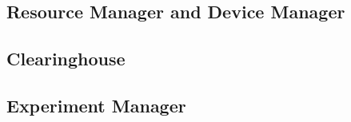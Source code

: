 \begin{comment}
The contract on line 11 - 17 defines that the target
for \path{get_location()} is \path{restricted_get_location()}. If 
\path{restrict_location} is the first descendant of the sandbox kernel, then
\path{restricted_get_location()} will replace the \path{get_location()}
in the sandbox virtual namespace. If there is a preceding blurring layer 
before \path{restrict_location} that already updated its 
function mapping for \path{get_location()} (like \path{blur_to_city}  
in Section~\ref{sec-precision-example}), then
\path{restricted_get_location()} will replace the \path{get_location()} call
with the policy implemented in this preceding blurring layer. In this case, 
the experiment code will get location updates once per 10 minutes, at
the city level. 

\bigskip
\end{comment}

\subsection{Resource Manager and Device Manager}

\subsection{Clearinghouse}

\subsection{Experiment Manager}
